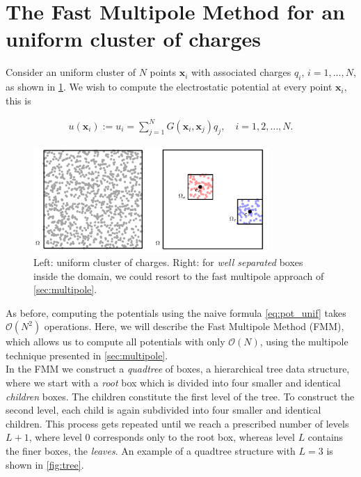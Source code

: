 \documentclass[final,onefignum,onetabnum]{siamart220329}
\newcommand{\bol}{\boldsymbol}
\newcommand{\Ocal}{\mathcal{O}}
\newcounter{example}
\begin{document}
\section{The Fast Multipole Method for an uniform cluster of charges}

Consider an uniform cluster of $N$ points $\bol x_i$ with associated charges $q_i$, $i=1,\dots,N$, as shown in \cref{fig:unif_points}. We wish to compute the electrostatic potential at every point $\bol x_i$, this is

\begin{align}
	u(\bol x_i) := u_i = \sum_{j=1}^{N} G(\bol x_i, \bol x_j)q_j, \quad i = 1,2,\dots,N. \label{eq:pot_unif}
\end{align}

\begin{figure}[h!]
	\centering
	\includegraphics[width=0.8\textwidth]{unif_points}
	\caption{Left: uniform cluster of charges. Right: for \textit{well separated} boxes inside the domain, we could resort to the fast multipole approach of \cref{sec:multipole}.}
\label{fig:unif_points}
\end{figure}

As before, computing the potentials using the naive formula \cref{eq:pot_unif} takes $\Ocal(N^2)$ operations. Here, we will describe the Fast Multipole Method (FMM), which allows us to compute all potentials with only $\Ocal(N)$, using the multipole technique presented in \cref{sec:multipole}.\\
In the FMM we construct a \textit{quadtree} of boxes, a hierarchical tree data structure, where we start with a \textit{root} box which is divided into four smaller and identical \textit{children} boxes. The children constitute the first level of the tree. To construct the second level, each child is again subdivided into four smaller and identical children. This process gets repeated until we reach a prescribed number of levels $L+1$, where level 0 corresponds only to the root box, whereas level $L$ contains the finer boxes, the \textit{leaves}. An example of a quadtree structure with $L=3$ is shown in \cref{fig:tree}.
\end{document}
